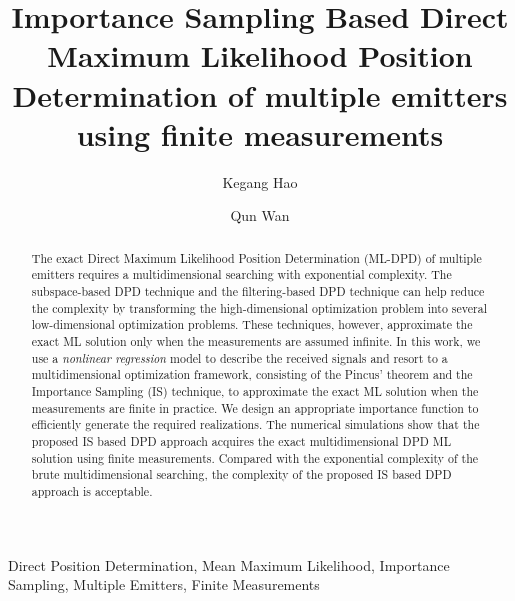 \documentclass[review]{elsarticle}
\begin{document}
\begin{frontmatter}

\title{Importance Sampling Based Direct Maximum Likelihood Position Determination of multiple emitters using finite measurements}
\author{Kegang Hao}
\author{Qun Wan} 
\address{the University of Electronic Science and Technology of China}

\begin{abstract}
The exact Direct Maximum Likelihood Position Determination (ML-DPD) of multiple emitters requires a multidimensional searching with exponential complexity. The subspace-based DPD technique and the filtering-based DPD technique can help reduce the complexity by transforming the high-dimensional optimization problem into several low-dimensional optimization problems. These techniques, however, approximate the exact ML solution only when the measurements are assumed infinite. In this work, we use a \emph{nonlinear regression} model to describe the received signals and resort to a multidimensional optimization framework, consisting of the Pincus' theorem and the Importance Sampling (IS) technique, to approximate the exact ML solution when the measurements are finite in practice. We design an appropriate importance function to efficiently generate the required realizations. The numerical simulations show that the proposed IS based DPD approach acquires the exact multidimensional DPD ML solution using finite measurements. Compared with the exponential complexity of the brute multidimensional searching, the complexity of the proposed IS based DPD approach is acceptable.
\end{abstract}

\begin{keyword}
Direct Position Determination, Mean Maximum Likelihood, Importance Sampling, Multiple Emitters, Finite Measurements
\end{keyword}

\end{frontmatter}

\linenumbers
\end{document}
